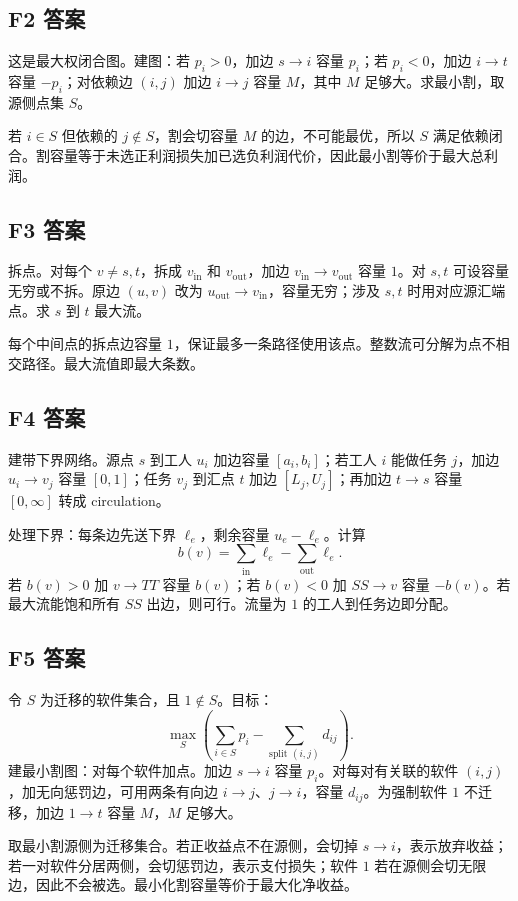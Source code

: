 \documentclass[UTF8,a4paper,11pt]{ctexart}
\begin{document}
\subsection*{F2 答案}

这是最大权闭合图。建图：若 $p_i>0$，加边 $s\to i$ 容量 $p_i$；若 $p_i<0$，加边 $i\to t$ 容量 $-p_i$；对依赖边 $(i,j)$ 加边 $i\to j$ 容量 $M$，其中 $M$ 足够大。求最小割，取源侧点集 $S$。

若 $i\in S$ 但依赖的 $j\notin S$，割会切容量 $M$ 的边，不可能最优，所以 $S$ 满足依赖闭合。割容量等于未选正利润损失加已选负利润代价，因此最小割等价于最大总利润。

\subsection*{F3 答案}

拆点。对每个 $v\ne s,t$，拆成 $v_{\mathrm{in}}$ 和 $v_{\mathrm{out}}$，加边 $v_{\mathrm{in}}\to v_{\mathrm{out}}$ 容量 $1$。对 $s,t$ 可设容量无穷或不拆。原边 $(u,v)$ 改为 $u_{\mathrm{out}}\to v_{\mathrm{in}}$，容量无穷；涉及 $s,t$ 时用对应源汇端点。求 $s$ 到 $t$ 最大流。

每个中间点的拆点边容量 $1$，保证最多一条路径使用该点。整数流可分解为点不相交路径。最大流值即最大条数。

\subsection*{F4 答案}

建带下界网络。源点 $s$ 到工人 $u_i$ 加边容量 $[a_i,b_i]$；若工人 $i$ 能做任务 $j$，加边 $u_i\to v_j$ 容量 $[0,1]$；任务 $v_j$ 到汇点 $t$ 加边 $[L_j,U_j]$；再加边 $t\to s$ 容量 $[0,\infty]$ 转成 circulation。

处理下界：每条边先送下界 $\ell_e$，剩余容量 $u_e-\ell_e$。计算
\[
b(v)=\sum_{\text{in}}\ell_e-\sum_{\text{out}}\ell_e.
\]
若 $b(v)>0$ 加 $v\to TT$ 容量 $b(v)$；若 $b(v)<0$ 加 $SS\to v$ 容量 $-b(v)$。若最大流能饱和所有 $SS$ 出边，则可行。流量为 $1$ 的工人到任务边即分配。

\subsection*{F5 答案}

令 $S$ 为迁移的软件集合，且 $1\notin S$。目标：
\[
\max_S\left(\sum_{i\in S}p_i-\sum_{\text{split }(i,j)}d_{ij}\right).
\]
建最小割图：对每个软件加点。加边 $s\to i$ 容量 $p_i$。对每对有关联的软件 $(i,j)$，加无向惩罚边，可用两条有向边 $i\to j$、$j\to i$，容量 $d_{ij}$。为强制软件 $1$ 不迁移，加边 $1\to t$ 容量 $M$，$M$ 足够大。

取最小割源侧为迁移集合。若正收益点不在源侧，会切掉 $s\to i$，表示放弃收益；若一对软件分居两侧，会切惩罚边，表示支付损失；软件 $1$ 若在源侧会切无限边，因此不会被选。最小化割容量等价于最大化净收益。
\end{document}

